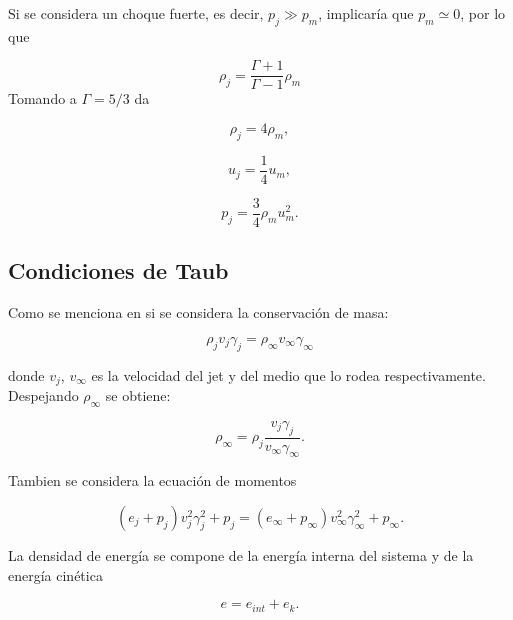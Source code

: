 \documentclass[12pt,a4paper]{book}
\begin{document}
\noindent Si se considera un choque fuerte, es decir, $p_j \gg p_m$, implicaría que $p_m \simeq 0$, por lo que

\begin{equation}
\rho_j = \frac{\Gamma +1}{\Gamma-1} \rho_m 
\end{equation}
Tomando a $\Gamma = 5/3$ da

\begin{equation}
\rho_j = 4 \rho_m,
\end{equation}

\begin{equation}
u_j = \frac{1}{4} u_m,
\end{equation}

\begin{equation}
p_{j} = \frac{3}{4}\rho_m u_m^{2}.
\end{equation}




\subsection{Condiciones de Taub}



Como se menciona en \citet{Landau1987} si se considera la conservación de masa:

\begin{equation}
  \rho_j v_j \gamma_j=  \rho_{\infty} v_{\infty} \gamma_{\infty}
\end{equation}

\noindent donde $v_j$, $v_\infty$ es la velocidad del jet y del medio que lo rodea respectivamente. Despejando $\rho_{\infty}$ se obtiene:

\begin{equation}\label{eq_masa_densidad_despejada}
  \rho_\infty = \rho_j \frac{v_j \gamma_j }{v_\infty \gamma_\infty}.
\end{equation}

\noindent Tambien se considera la ecuación de momentos

\begin{equation}
  \left( e_j + p_j\right) v^2_j \gamma^2_j + p_j = \left( e_{\infty} + p_{\infty}\right) v^2_{\infty} \gamma^2_{\infty} + p_{\infty}.
\end{equation}

\noindent La densidad de energía se compone de la energía interna del sistema y de la energía cinética

\begin{equation} \label{eq_densidad_de_energia}
  e = e_{int} + e_k.
\end{equation}
\end{document}
